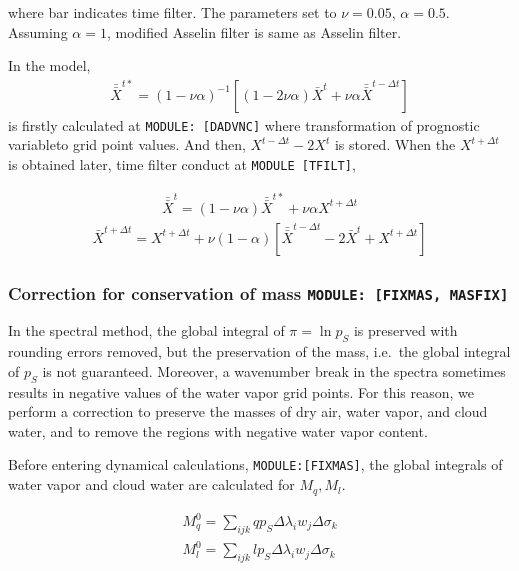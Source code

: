 where bar indicates time filter. The parameters set to \(\nu=0.05\),
\(\alpha=0.5\). Assuming \(\alpha=1\), modified Asselin filter is same
as Asselin filter.

In the model, \begin{eqnarray}
 \bar{\bar{X}}^{t*} = (1-\nu\alpha)^{-1}[(1-2\nu\alpha)\bar{X}^t +\nu\alpha \bar{\bar{X}}^{t-\Delta t} ]
\end{eqnarray} is firstly calculated at \texttt{MODULE:\ {[}DADVNC{]}} where
transformation of prognostic variableto grid point values. And then,
\(X^{t-\Delta t}-2X^t\) is stored. When the \(X^{t+\Delta t}\) is
obtained later, time filter conduct at \texttt{MODULE\ {[}TFILT{]}},

\begin{eqnarray}
 \bar{\bar{X}}^{t} = (1-\nu\alpha)\bar{\bar{X}}^{t*} +\nu\alpha X^{t+\Delta t} 
\end{eqnarray} \begin{eqnarray}
\bar{X}^{t+\Delta t} = X^{t+\Delta t} + \nu (1-\alpha)[ \bar{\bar{X}}^{t-\Delta t} - 2\bar{X}^{t} + X^{t+\Delta t}]
 \end{eqnarray}

\hypertarget{correction-for-conservation-of-mass-module-fixmas-masfix}{%
\subsubsection{\texorpdfstring{Correction for conservation of mass
\texttt{MODULE:\ {[}FIXMAS,\ MASFIX{]}}}{Correction for conservation of mass MODULE: {[}FIXMAS, MASFIX{]}}}\label{correction-for-conservation-of-mass-module-fixmas-masfix}}

In the spectral method, the global integral of \(\pi = \ln p_S\) is
preserved with rounding errors removed, but the preservation of the
mass, i.e.~the global integral of \(p_S\) is not guaranteed. Moreover, a
wavenumber break in the spectra sometimes results in negative values of
the water vapor grid points. For this reason, we perform a correction to
preserve the masses of dry air, water vapor, and cloud water, and to
remove the regions with negative water vapor content.

Before entering dynamical calculations, \texttt{MODULE:{[}FIXMAS{]}},
the global integrals of water vapor and cloud water are calculated for
\(M_q, M_l\).

\begin{eqnarray}
  M_q^0  =  \sum_{ijk} q p_S  \Delta\lambda_i w_j \Delta\sigma_k  \\
  M_l^0  =  \sum_{ijk} l p_S  \Delta\lambda_i w_j \Delta\sigma_k
\end{eqnarray}

